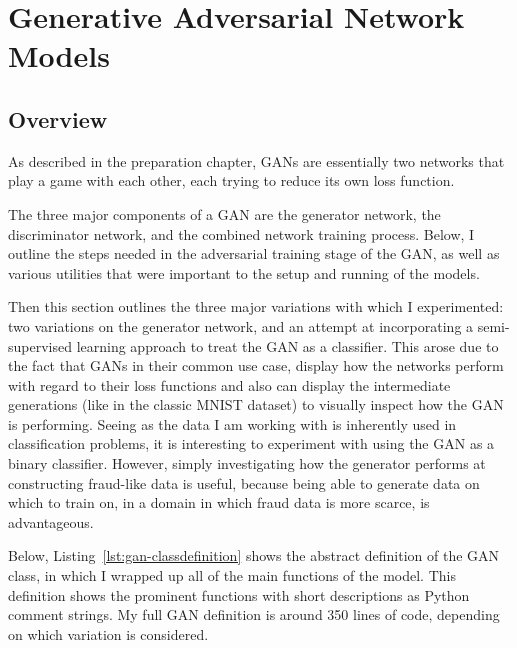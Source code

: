 \documentclass[12pt,a4paper,twoside]{report}
\begin{document}




\section{Generative Adversarial Network Models}

\subsection{Overview}
As described in the preparation chapter, GANs are essentially two networks that play a game with each other, each trying to reduce its own loss function. 

The three major components of a GAN are the generator network, the discriminator network, and the combined network training process. Below, I outline the steps needed in the adversarial training stage of the GAN, as well as various utilities that were important to the setup and running of the models. 

Then this section outlines the three major variations with which I experimented: two variations on the generator network, and an attempt at incorporating a semi-supervised learning approach to treat the GAN as a classifier. This arose due to the fact that GANs in their common use case, display how the networks perform with regard to their loss functions and also can display the intermediate generations (like in the classic MNIST dataset) to visually inspect how the GAN is performing. Seeing as the data I am working with is inherently used in classification problems, it is interesting to experiment with using the GAN as a binary classifier. However, simply investigating how the generator performs at constructing fraud-like data is useful, because being able to generate data on which to train on, in a domain in which fraud data is more scarce, is advantageous.  

Below, Listing~\ref{lst:gan-classdefinition} shows the abstract definition of the GAN class, in which I wrapped up all of the main functions of the model. This definition shows the prominent functions with short descriptions as Python comment strings. My full GAN definition is around 350 lines of code, depending on which variation is considered. 

\end{document}
